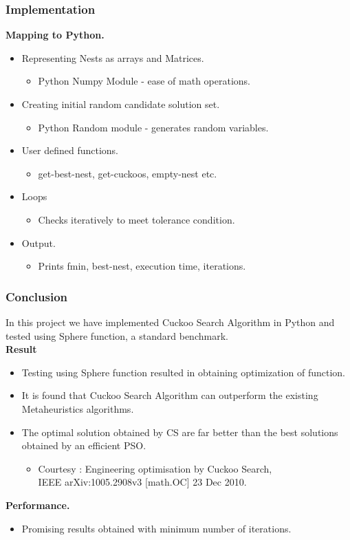 \documentclass[10pt]{beamer}
\begin{document}
\begin{frame}
  \frametitle{Implementation}
  \textbf{Mapping to Python.}
  \begin{itemize}
    \item Representing Nests as arrays and Matrices.
    	\begin{itemize}
    	\item Python Numpy Module - ease of math operations.
    	\end{itemize}
    \item Creating initial random candidate solution set.
    	\begin{itemize}
    	\item Python Random module - generates random variables.
    	\end{itemize}
    \item User defined functions.
    	\begin{itemize}
    	\item get-best-nest, get-cuckoos, empty-nest etc.
    	\end{itemize}
    \item Loops
    	\begin{itemize}
    	\item Checks iteratively to meet tolerance condition.
    	\end{itemize}
    \item Output.
    	\begin{itemize}
    	\item Prints fmin, best-nest, execution time, iterations.
    	\end{itemize}
  \end{itemize}
\end{frame}




\begin{frame}
  \frametitle{Conclusion}
  In this project we have implemented Cuckoo Search Algorithm in Python and tested using Sphere function, a standard benchmark.\\
  \medskip
  \textbf{Result}
  \begin{itemize}
  	\item Testing using Sphere function resulted in obtaining optimization of function.
  	\item It is found that Cuckoo Search Algorithm can outperform the existing Metaheuristics algorithms.
  	\item The optimal solution obtained by CS are far better than the best solutions obtained by an efficient PSO.
  	\begin{itemize}
  	\item Courtesy : Engineering optimisation by Cuckoo Search,\\ IEEE arXiv:1005.2908v3 [math.OC] 23 Dec 2010.
  	\end{itemize} 
  \end{itemize}
  \textbf{Performance.}
  \begin{itemize}
    \item Promising results obtained with minimum number of iterations.	
  \end{itemize}  
\end{frame}
\end{document}

